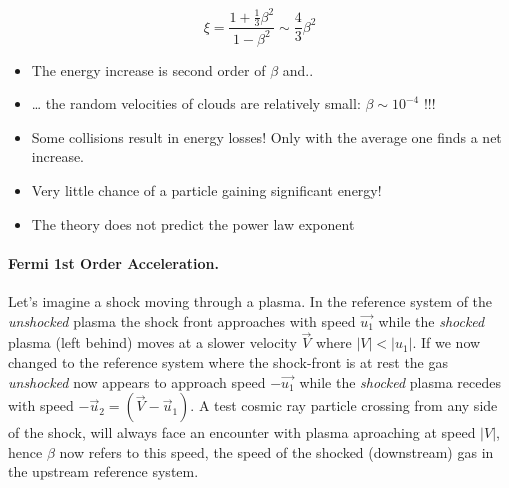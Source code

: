 \documentclass[
  letterpaper,
  DIV=11,
  numbers=noendperiod]{scrreprt}
\let\oldparagraph\paragraph
\renewcommand{\paragraph}[1]{\oldparagraph{#1}\mbox{}}
\providecommand{\tightlist}{%
  \setlength{\itemsep}{0pt}\setlength{\parskip}{0pt}}\usepackage{longtable,booktabs,array}
\begin{document}
\[\xi = \frac{1 + \frac{1}{3}\beta^2}{1 - \beta^2} \sim \frac{4}{3}\beta^2\]

\begin{tcolorbox}[enhanced jigsaw, colframe=quarto-callout-important-color-frame, leftrule=.75mm, left=2mm, opacitybacktitle=0.6, colbacktitle=quarto-callout-important-color!10!white, coltitle=black, arc=.35mm, titlerule=0mm, toprule=.15mm, opacityback=0, bottomrule=.15mm, breakable, bottomtitle=1mm, rightrule=.15mm, toptitle=1mm, colback=white, title=\textcolor{quarto-callout-important-color}{\faExclamation}\hspace{0.5em}{Problems wih the 2nd order acceleration}]

\begin{itemize}
\tightlist
\item
  The energy increase is second order of \(\beta\) and..
\item
  \ldots{} the random velocities of clouds are relatively small:
  \(\beta \sim 10^{-4}\) !!!
\item
  Some collisions result in energy losses! Only with the average one
  finds a net increase.
\item
  Very little chance of a particle gaining significant energy!
\item
  The theory does not predict the power law exponent
\end{itemize}

\end{tcolorbox}

\paragraph{Fermi 1st Order
Acceleration.}\label{fermi-1st-order-acceleration.}

Let's imagine a shock moving through a plasma. In the reference system
of the \emph{unshocked} plasma the shock front approaches with speed
\(\vec{u_1}\) while the \emph{shocked} plasma (left behind) moves at a
slower velocity \(\vec{V}\) where \(|V| < |u_1|\). If we now changed to
the reference system where the shock-front is at rest the gas
\emph{unshocked} now appears to approach speed \(-\vec{u_1}\) while the
\emph{shocked} plasma recedes with speed
\({-\vec u_2 = (\vec{V} - \vec u_1)}\). A test cosmic ray particle
crossing from any side of the shock, will always face an encounter with
plasma aproaching at speed \(|V|\), hence \(\beta\) now refers to this
speed, the speed of the shocked (downstream) gas in the upstream
reference system.
\end{document}
